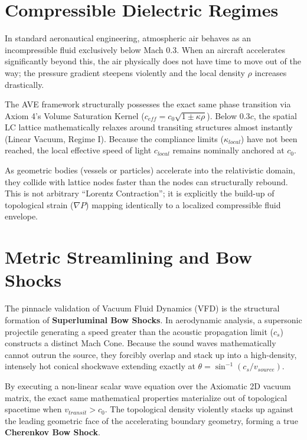 

\section{Compressible Dielectric Regimes}

In standard aeronautical engineering, atmospheric air behaves as an incompressible fluid exclusively below Mach 0.3. When an aircraft accelerates significantly beyond this, the air physically does not have time to move out of the way; the pressure gradient steepens violently and the local density $\rho$ increases drastically. 

The AVE framework structurally possesses the exact same phase transition via Axiom 4's Volume Saturation Kernel ($c_{eff} = c_0\sqrt{1 \pm \kappa\rho}$). 
Below $0.3c$, the spatial LC lattice mathematically relaxes around transiting structures almost instantly (Linear Vacuum, Regime I). Because the compliance limits ($\kappa_{local}$) have not been reached, the local effective speed of light $c_{local}$ remains nominally anchored at $c_0$.

As geometric bodies (vessels or particles) accelerate into the relativistic domain, they collide with lattice nodes faster than the nodes can structurally rebound. This is not arbitrary ``Lorentz Contraction''; it is explicitly the build-up of topological strain ($\nabla P$) mapping identically to a localized compressible fluid envelope.

\section{Metric Streamlining and Bow Shocks}

The pinnacle validation of Vacuum Fluid Dynamics (VFD) is the structural formation of \textbf{Superluminal Bow Shocks}.
In aerodynamic analysis, a supersonic projectile generating a speed greater than the acoustic propagation limit ($c_s$) constructs a distinct Mach Cone. Because the sound waves mathematically cannot outrun the source, they forcibly overlap and stack up into a high-density, intensely hot conical shockwave extending exactly at $\theta = \sin^{-1}(c_s / v_{source})$.

By executing a non-linear scalar wave equation over the Axiomatic 2D vacuum matrix, the exact same mathematical properties materialize out of topological spacetime when $v_{transit} > c_0$. The topological density violently stacks up against the leading geometric face of the accelerating boundary geometry, forming a true \textbf{Cherenkov Bow Shock}.

